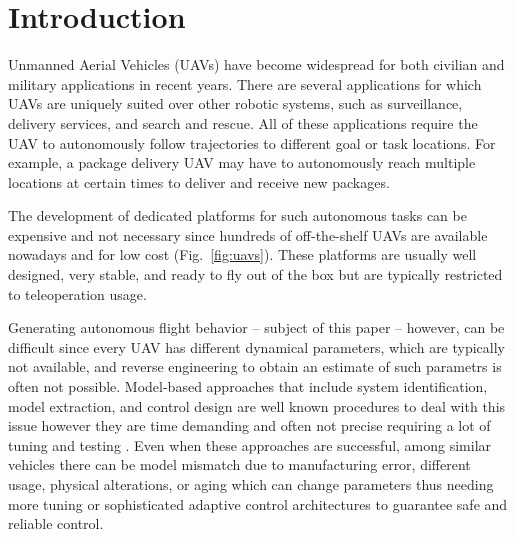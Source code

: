 \documentclass[letterpaper, 10 pt, conference]{ieeeconf}  %
\newcommand\NB[1]{$\spadesuit$\footnote{NB: #1}}
\begin{document}
\section{Introduction}
Unmanned Aerial Vehicles (UAVs) have become widespread for both civilian and military applications in recent years. There are several applications for which UAVs are uniquely suited over other robotic systems, such as surveillance, delivery services, and search and rescue. All of these applications require the UAV to autonomously follow trajectories to different goal or task locations. For example, a package delivery UAV may have to autonomously reach multiple locations at certain times to deliver and receive new packages. 

The development of dedicated platforms for such autonomous tasks can be expensive and not necessary since hundreds of off-the-shelf UAVs are available nowadays and for low cost (Fig.~\ref{fig:uavs}). These platforms are usually well designed, very stable, and ready to fly out of the box but are typically restricted to teleoperation usage.

Generating autonomous flight behavior -- subject of this paper --  however, can be difficult since every UAV has different dynamical parameters, which are typically not available, and reverse engineering to obtain an estimate of such parametrs is often not possible. Model-based approaches that include system identification, model extraction, and control design are well known procedures to deal with this issue however they are time demanding and often not precise requiring a lot of tuning and testing \cite{modelbased1}. Even when these approaches are successful, among similar vehicles there can be model mismatch due to manufacturing error, different usage, physical alterations, or aging which can change parameters thus needing more tuning or sophisticated adaptive control architectures to guarantee safe and reliable control. 
\end{document}

